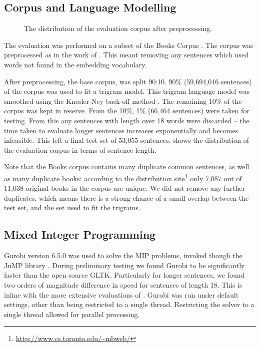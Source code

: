 \documentclass[compsoc]{IEEEtran}
\theoremstyle{plain}
\theoremstyle{definition}
\begin{document}
\subsection{Corpus and Language Modelling}
\begin{figure}
	\caption{\label{fig:corpus} The distribution of the evaluation corpus after preprocessing.}
\end{figure}

The evaluation was performed on a subset of the Books Corpus \parencite{moviebook}. The corpus was preprocessed as in the work of \textcite{White2015BOWgen}. This meant removing any sentences which used words not found in the embedding vocabulary.

After preprocessing, the base corpus, was split 90:10. 90\% (59,694,016 sentences) of the corpus was used to fit a trigram model. This trigram language model was smoothed using the Knesler-Ney back-off method \parencite{kneser1995improved}. The remaining 10\% of the corpus was kept in reserve. From the 10\%, 1\% (66,464 sentences) were taken for testing. From this any sentences with length over 18 words were discarded -- the time taken to evaluate longer sentences increases exponentially and becomes infeasible. This left a final test set of 53,055 sentences.  shows the distribution of the evaluation corpus in terms of sentence length.
 
Note that the Books corpus contains many duplicate common sentences, as well as many duplicate books: according to the distribution site\footnote{\url{http://www.cs.toronto.edu/~mbweb/}} only 7,087 out of 11,038 original books in the corpus are unique. We did not remove any further duplicates, which means there is a strong chance of a small overlap between the test set, and the set used to fit the trigrams.
 

\subsection{Mixed Integer Programming}
Gurobi version 6.5.0 was used to solve the MIP problems, invoked though the JuMP library \parencite{jump}. During preliminary testing we found Gurobi to be significantly faster than the open source GLTK. Particularly for longer sentences, we found two orders of magnitude difference in speed for sentences of length 18. This is inline with the more extensive evaluations of \textcite{meindl2012analysis}. Gurobi was run under default settings, other than being restricted to a single thread. Restricting the solver to a single thread allowed for parallel processing.
\end{document}
